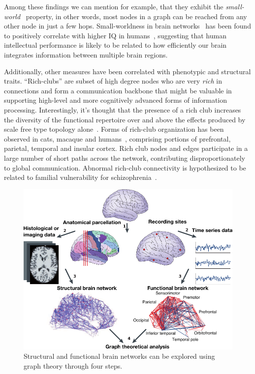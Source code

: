 Among these findings we can mention for example, that they exhibit the \emph{small-world}~\cite{Watts1998,sporns2002} property, in other words, most nodes in a graph can be reached from any other node in just a few hops. Small-worldness in brain networks~\cite{vandenheuvel2008} has been found to positively correlate with higher IQ in humans~\cite{vandenheuvel2009}, suggesting that human intellectual performance is likely to be related to how efficiently our brain integrates information between multiple brain regions.

Additionally, other measures have been correlated with phenotypic and structural traits. ``Rich-clubs'' are subset of high degree nodes who are very \emph{rich} in connections and form a communication backbone that might be valuable in supporting high-level and more cognitively advanced forms of information processing. Interestingly, it's thought that the presence of a rich club increases the diversity of the functional repertoire over and above the effects produced by scale free type topology alone~\cite{senden2014}.
Forms of rich-club organization has been observed in cats, macaque and humans~\cite{vandenheuvel2011,harriger2012,DeReus2013a,collin2014}, comprising portions of prefrontal, parietal, temporal and insular cortex. Rich club nodes and edges participate in a large number of short paths across the network, contributing disproportionately to global communication. 
Abnormal rich-club connectivity is hypothesized to be related  to familial vulnerability for schizophrenia~\cite{collin2014impaired}.

\begin{figure}[htb!]
\centering
\includegraphics[width=1.0\textwidth]{images/bullmore_2009_pipeline.pdf}
\caption{Structural and functional brain networks can be explored using graph theory through four steps.}
\end{figure}

